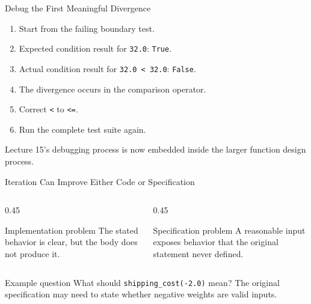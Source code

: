 \documentclass[aspectratio=169,10pt]{beamer}
\begin{document}
\begin{frame}{Debug the First Meaningful Divergence}
  \begin{enumerate}
    \item Start from the failing boundary test.
    \item Expected condition result for \texttt{32.0}: \texttt{True}.
    \item Actual condition result for \texttt{32.0 < 32.0}: \texttt{False}.
    \item The divergence occurs in the comparison operator.
    \item Correct \texttt{<} to \texttt{<=}.
    \item Run the complete test suite again.
  \end{enumerate}

  \begin{keyidea}
    Lecture 15's debugging process is now embedded inside the larger function design process.
  \end{keyidea}
\end{frame}

\begin{frame}{Iteration Can Improve Either Code or Specification}
  \begin{columns}[T,onlytextwidth]
    \begin{column}{0.45\textwidth}
      \begin{block}{Implementation problem}
        The stated behavior is clear, but the body does not produce it.
      \end{block}
    \end{column}
    \begin{column}{0.45\textwidth}
      \begin{block}{Specification problem}
        A reasonable input exposes behavior that the original statement never defined.
      \end{block}
    \end{column}
  \end{columns}

  \begin{block}{Example question}
    What should \texttt{shipping\_cost(-2.0)} mean? The original specification may need to state whether negative weights are valid inputs.
  \end{block}
\end{frame}
\end{document}
